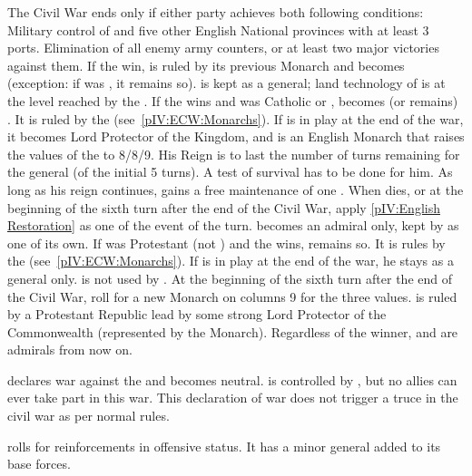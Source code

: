 \phpaix
\aparag The Civil War ends only if either party achieves both following
conditions:
\bparag Military control of  and five other English
National provinces with at least 3 ports.
\bparag Elimination of all enemy army counters, or at least two major
victories against them.
\aparag If the \royal win, \ENG is ruled by its previous Monarch and becomes
\CATHCR (exception: if \ENG was \CATHCO, it remains so). \leaderRupert is kept
as a general; land technology of \ENG is at the level reached by the \royal.
\aparag If the \parl wins and \ENG was Catholic or \PROTANG, \ENG becomes (or
remains) \PROTANG.  It is ruled by the 
(see~\ref{pIV:ECW:Monarchs}).
\bparag If \leaderCromwell is in play at the end of the war, it becomes Lord
Protector of the Kingdom, and is an English Monarch that raises the values of
the  to 8/8/9. His Reign is to last the number of turns
remaining for the general (of the initial 5 turns).  A test of survival has to
be done for him. As long as his reign continues, \ENG gains a free maintenance
of one \ARMY\faceplus.
\bparag When \leaderCromwell dies, or at the beginning of the sixth turn after
the end of the Civil War, apply \ref{pIV:English Restoration} as one of the
event of the turn.
\bparag \leaderRupert becomes an admiral only, kept by \ENG as one of its own.
\aparag If \ENG was Protestant (not \PROTANG) and the \parl wins, \ENG remains
so. It is rules by the  (see~\ref{pIV:ECW:Monarchs}).
\bparag If \leaderCromwell is in play at the end of the war, he stays as a
general only. \leaderRupert is not used by \ENG.
\bparag At the beginning of the sixth turn after the end of the Civil War,
roll for a new Monarch on columns 9 for the three values. \ENG is ruled by a
Protestant Republic lead by some strong Lord Protector of the Commonwealth
(represented by the Monarch).
\aparag Regardless of the winner, \leaderMonck and \leaderBlake are admirals
from now on.



\phevnt
\aparag \paysecosse declares war against the \royal and becomes neutral.
\paysecosse is controlled by \FRA, but no allies can ever take part in this
war. This declaration of war does not trigger a truce in the civil war as per
normal rules.

\phadm
\aparag \paysecosse rolls for reinforcements in offensive status.  It has a
minor general added to its base forces.

